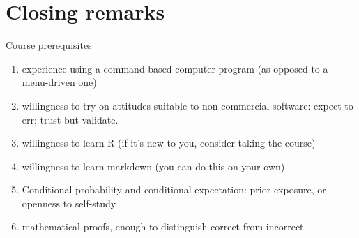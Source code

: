 
\section*{Closing remarks}

 
\begin{frame}{Course prerequisites}
  \begin{enumerate}
\item experience using a command-based computer program (as opposed to a menu-driven one)
\item willingness to try on attitudes suitable to
  non-commercial software: expect to err; trust but validate.
\item willingness to learn R  (if it's new to you, consider taking the course)
\item willingness to learn markdown (you can do this on your own)
\item Conditional probability and conditional expectation: prior
  exposure, or openness to self-study
  \item mathematical proofs, enough to distinguish correct from incorrect


  \end{enumerate}
\end{frame}




